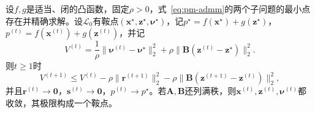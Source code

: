 \begin{theorem}[两块ADMM的收敛]
\label{thm:pm-admm-convergence}
设$f,g$是适当、闭的凸函数，固定$\rho>0$，式~\eqref{eq:pm-admm}的两个子问题的最小点存在并精确求解。设$\mathcal{L}_0$有鞍点$(\bm{x}^\star,\bm{z}^\star,\bm{\nu}^\star)$，记$p^\star=f(\bm{x}^\star)+g(\bm{z}^\star)$，$p^{(t)}=f(\bm{x}^{(t)})+g(\bm{z}^{(t)})$，并记
\begin{equation}
 V^{(t)}=\frac1\rho\lVert\bm{\nu}^{(t)}-\bm{\nu}^\star\rVert_2^2+\rho\lVert\bm{B}(\bm{z}^{(t)}-\bm{z}^\star)\rVert_2^2 .
 \label{eq:pm-admm-lyapunov}
\end{equation}
则$t\geq1$时
\begin{equation}
 V^{(t+1)}\leq V^{(t)}-\rho\lVert\bm{r}^{(t+1)}\rVert_2^2-\rho\lVert\bm{B}(\bm{z}^{(t+1)}-\bm{z}^{(t)})\rVert_2^2 ,
 \label{eq:pm-admm-descent}
\end{equation}
并且$\bm{r}^{(t)}\to\bm{0}$，$\bm{s}^{(t)}\to\bm{0}$，$p^{(t)}\to p^\star$。若$\bm{A},\bm{B}$还列满秩，则$\bm{x}^{(t)},\bm{z}^{(t)},\bm{\nu}^{(t)}$都收敛，其极限构成一个鞍点。
\end{theorem}

